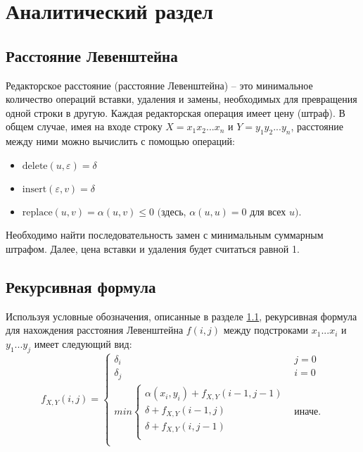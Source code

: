 \chapter{Аналитический раздел}\label{analyth}

\section{Расстояние Левенштейна}\label{defs}

Редакторское расстояние (расстояние Левенштейна) -- это минимальное количество операций вставки, удаления и замены, необходимых для превращения одной строки в другую. Каждая редакторская операция имеет цену (штраф). 
В общем случае, имея на входе строку $X = x_1x_2...x_n$ и $Y = y_1y_2...y_n$, расстояние между ними можно вычислить с помощью операций:
\begin{itemize}
	\item ${\text{delete}(u, \varepsilon) = \delta}$
	\item $\text{insert}(\varepsilon, v) = \delta$
	\item $\text{replace}(u, v) = \alpha(u, v) \leq 0$  $($здесь, $\alpha(u, u) = 0$ для всех $u).$
\end{itemize}

Необходимо найти последовательность замен с минимальным суммарным штрафом. Далее, цена вставки и удаления будет считаться равной 1.

\section{Рекурсивная формула}
Используя условные обозначения, описанные в разделе \ref{defs}, рекурсивная формула для нахождения расстояния Левенштейна $f(i, j)$ между подстроками $x_1...x_i$ и $y_1...y_j$ имеет следующий вид:
\begin{equation}
	f_{X,Y}(i, j) = 
	\begin{cases}
		\delta_i & j = 0 \\
		\delta_j & i = 0 \\ 
		min 
		\begin{cases}
			\alpha(x_i, y_i) + f_{X,Y}(i - 1, j - 1) \\
			\delta + f_{X,Y}(i - 1, j) \\
			\delta + f_{X,Y}(i, j - 1) \\
		\end{cases} & \text{иначе.} \\
	\end{cases}
\end{equation}

